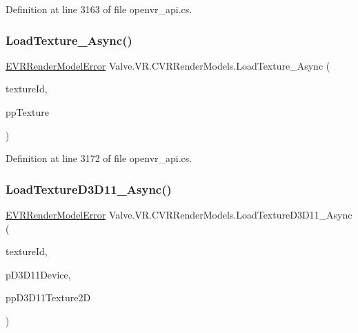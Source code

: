 Definition at line 3163 of file openvr\+\_\+api.\+cs.

\mbox{\label{class_valve_1_1_v_r_1_1_c_v_r_render_models_af399586b6d1e2baffab9c62e3f5e0a6f}} 
\subsubsection{\texorpdfstring{LoadTexture\_Async()}{LoadTexture\_Async()}}
{\footnotesize\ttfamily \mbox{\hyperlink{namespace_valve_1_1_v_r_ac95dda09bbb588fd83a8ac0ba3c82266}{E\+V\+R\+Render\+Model\+Error}} Valve.\+V\+R.\+C\+V\+R\+Render\+Models.\+Load\+Texture\+\_\+\+Async (\begin{DoxyParamCaption}\item[{int}]{texture\+Id,  }\item[{ref Int\+Ptr}]{pp\+Texture }\end{DoxyParamCaption})}



Definition at line 3172 of file openvr\+\_\+api.\+cs.

\mbox{\label{class_valve_1_1_v_r_1_1_c_v_r_render_models_ab3a742c51f8ca3f667b99d8cdbadd366}} 
\subsubsection{\texorpdfstring{LoadTextureD3D11\_Async()}{LoadTextureD3D11\_Async()}}
{\footnotesize\ttfamily \mbox{\hyperlink{namespace_valve_1_1_v_r_ac95dda09bbb588fd83a8ac0ba3c82266}{E\+V\+R\+Render\+Model\+Error}} Valve.\+V\+R.\+C\+V\+R\+Render\+Models.\+Load\+Texture\+D3\+D11\+\_\+\+Async (\begin{DoxyParamCaption}\item[{int}]{texture\+Id,  }\item[{Int\+Ptr}]{p\+D3\+D11\+Device,  }\item[{ref Int\+Ptr}]{pp\+D3\+D11\+Texture2D }\end{DoxyParamCaption})}



